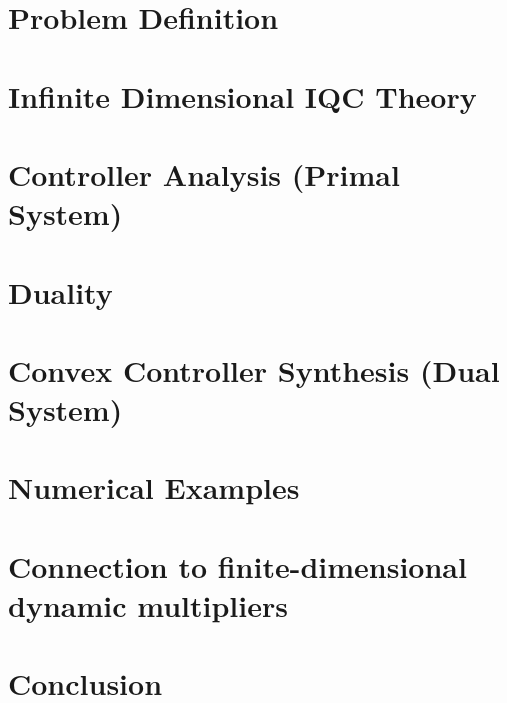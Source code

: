 \documentclass[final,5p,twocolumn]{elsarticle}
\begin{document}
\section{Problem Definition}\label{sec:problem-definition}


\section{Infinite Dimensional IQC Theory}\label{sec:iqc-theory}


\section{Controller Analysis (Primal System)}\label{sec:primal-controller-analysis}


\section{Duality}\label{sec:duality}\label{sec:dynamic-filtering-duality}


\section{Convex Controller Synthesis (Dual System)}\label{sec:dual-controller-synthesis}


\section{Numerical Examples}\label{sec:numerical-examples}


\section{Connection to finite-dimensional dynamic multipliers}\label{sec:finite-dimensional-multipliers}
\label{sec:finite-dimensional-dynamic-multipliers}


\section{Conclusion}\label{sec:conclusion}

\end{document}
